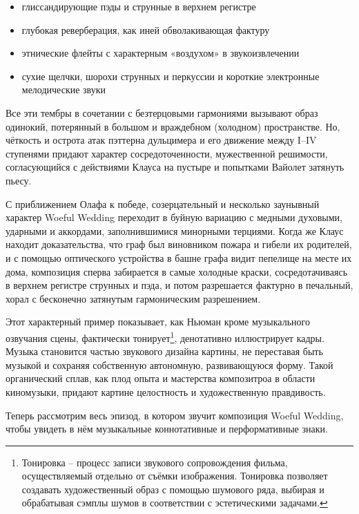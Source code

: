 \begin{itemize}
\tightlist
\item
  глиссандирующие пэды и струнные в верхнем регистре
\item
  глубокая реверберация, как иней обволакивающая фактуру
\item
  этнические флейты с характерным «воздухом» в звукоизвлечении
\item
  сухие щелчки, шорохи струнных и перкуссии и короткие электронные мелодические звуки
\end{itemize}

Все эти тембры в сочетании с безтерцовыми гармониями вызывают образ одинокий, потерянный в большом и враждебном (холодном) пространстве.
Но, чёткость и острота атак пэттерна дульцимера и его движение между I--IV ступенями придают характер сосредоточенности, мужественной решимости, согласующийся с действиями Клауса на пустыре и попытками Вайолет затянуть пьесу.

С приближением Олафа к победе, созерцательный и несколько заунывный характер Woeful Wedding переходит в буйную вариацию с медными духовыми, ударными и аккордами, заполнившимися минорными терциями.
Когда же Клаус находит доказательства, что граф был виновником пожара и гибели их родителей, и с помощью оптического устройства в башне графа видит пепелище на месте их дома, композиция сперва забирается в самые холодные краски, сосредотачиваясь в верхнем регистре струнных и пэда, и потом разрешается фактурно в печальный, хорал с бесконечно затянутым гармоническим разрешением.

Этот характерный пример показывает, как Ньюман кроме музыкального озвучания сцены, фактически тонирует\footnote{Тонировка -- процесс записи звукового сопровождения фильма, осуществляемый отдельно от съёмки изображения. Тонировка позволяет создавать художественный образ с помощью шумового ряда, выбирая и обрабатывая сэмплы шумов в соответствии с эстетическими задачами.}, денотативно иллюстрирует кадры.
Музыка становится частью звукового дизайна картины, не переставая быть музыкой и сохраняя собственную автономную, развивающуюся форму.
Такой органический сплав, как плод опыта и мастерства композитроа в области киномузыки, придают картине целостность и художественную правдивость.

Теперь рассмотрим весь эпизод, в котором звучит композиция Woeful Wedding, чтобы увидеть в нём музыкальные коннотативные и перформативные знаки.

